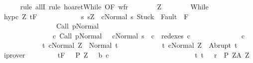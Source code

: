 \begin{isabellebody}
\ \ \ \ \isamarkupfalse%
\ {\isacharparenleft}rule\ allI{\isacharcomma}\ rule\ hoaret{\isachardot}While\ {\isacharbrackleft}OF\ wf{\isacharunderscore}r{\isacharbrackright}{\isacharparenright}\isanewline
\ \ \ \ \ \ \isamarkupfalse%
\ Z\isanewline
\ \ \ \ \ \ \isamarkupfalse%
\ While\ \isanewline
\ \ \ \ \ \ \isamarkupfalse%
\ hyp{\isacharunderscore}c{\isacharcolon}\ {\isachardoublequoteopen}{\isasymforall}Z{\isachardot}\ {\isasymGamma}{\isacharcomma}{\isasymTheta}{\isasymturnstile}\isactrlsub t\isactrlbsub {\isacharslash}F\isactrlesub \isanewline
\ \ \ \ \ \ \ \ \ \ \ \ {\isacharbraceleft}s{\isachardot}\ s{\isacharequal}Z\ {\isasymand}\ {\isasymGamma}{\isasymturnstile}{\isasymlangle}c{\isacharcomma}Normal\ s{\isasymrangle}\ {\isasymRightarrow}{\isasymnotin}{\isacharparenleft}{\isacharbraceleft}Stuck{\isacharbraceright}\ {\isasymunion}\ Fault\ {\isacharbackquote}\ {\isacharparenleft}{\isacharminus}F{\isacharparenright}{\isacharparenright}\ {\isasymand}\ \isanewline
\ \ \ \ \ \ \ \ \ \ \ \ \ \ \ \ {\isasymGamma}{\isasymturnstile}Call\ p{\isasymdown}Normal\ {\isasymsigma}\ {\isasymand}\ \isanewline
\ \ \ \ \ \ \ \ \ \ \ \ \ \ \ {\isacharparenleft}{\isasymexists}c{\isacharprime}{\isachardot}\ {\isasymGamma}{\isasymturnstile}{\isacharparenleft}Call\ p{\isacharcomma}Normal\ {\isasymsigma}{\isacharparenright}\ {\isasymrightarrow}\isactrlsup {\isacharplus}\ {\isacharparenleft}c{\isacharprime}{\isacharcomma}Normal\ s{\isacharparenright}\ {\isasymand}\ c\ {\isasymin}\ redexes\ c{\isacharprime}{\isacharparenright}{\isacharbraceright}\isanewline
\ \ \ \ \ \ \ \ \ \ \ \ \ \ c\ \isanewline
\ \ \ \ \ \ \ \ \ \ \ \ {\isacharbraceleft}t{\isachardot}\ {\isasymGamma}{\isasymturnstile}{\isasymlangle}c{\isacharcomma}Normal\ Z{\isasymrangle}\ {\isasymRightarrow}\ Normal\ t{\isacharbraceright}{\isacharcomma}\isanewline
\ \ \ \ \ \ \ \ \ \ \ \ {\isacharbraceleft}t{\isachardot}\ {\isasymGamma}{\isasymturnstile}{\isasymlangle}c{\isacharcomma}Normal\ Z{\isasymrangle}\ {\isasymRightarrow}\ Abrupt\ t{\isacharbraceright}{\isachardoublequoteclose}\ \isamarkupfalse%
\ iprover\isanewline
\ \ \ \ \ \ \isamarkupfalse%
\ {\isachardoublequoteopen}{\isasymforall}{\isasymsigma}{\isachardot}\ {\isasymGamma}{\isacharcomma}{\isasymTheta}{\isasymturnstile}\isactrlsub t\isactrlbsub {\isacharslash}F\isactrlesub \ {\isacharparenleft}{\isacharbraceleft}{\isasymsigma}{\isacharbraceright}\ {\isasyminter}\ {\isacharquery}P{\isacharprime}\ Z\ \ {\isasyminter}\ b{\isacharparenright}\ c\ \isanewline
\ \ \ \ \ \ \ \ \ \ \ \ \ \ \ \ \ \ \ \ \ \ \ {\isacharparenleft}{\isacharbraceleft}t{\isachardot}\ {\isacharparenleft}t{\isacharcomma}\ {\isasymsigma}{\isacharparenright}\ {\isasymin}\ {\isacharquery}r{\isacharbraceright}\ {\isasyminter}\ {\isacharquery}P{\isacharprime}\ Z{\isacharparenright}{\isacharcomma}{\isacharparenleft}{\isacharquery}A\ Z{\isacharparenright}{\isachardoublequoteclose}\isanewline

\end{isabellebody}

